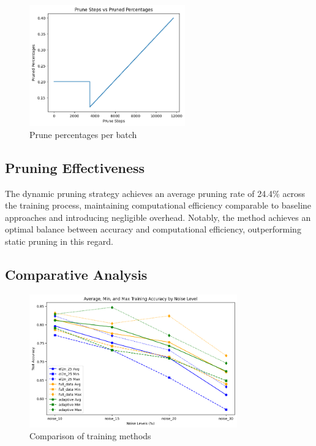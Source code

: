 \documentclass{article}
\begin{document}
\begin{figure}[h]
    \centering
    \includegraphics[width=0.6\textwidth]{output_prune_percentages.png}
    \caption{Prune percentages per batch}
    \label{fig:prune_percent}
\end{figure}

\subsection{Pruning Effectiveness}

The dynamic pruning strategy achieves an average pruning rate of 24.4\% across the training process, maintaining computational efficiency comparable to baseline approaches and introducing negligible overhead. Notably, the method achieves an optimal balance between accuracy and computational efficiency, outperforming static pruning in this regard.

\subsection{Comparative Analysis}\label{comparative_analysis}

\begin{figure}[h]
    \centering
    \includegraphics[width=0.8\textwidth]{output_comparison2.png}
    \caption{Comparison of training methods}
    \label{fig:comparison}
\end{figure}
\end{document}
